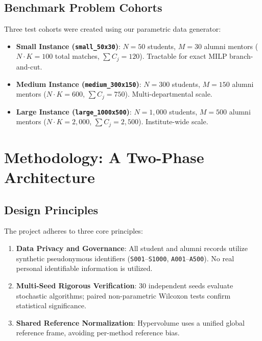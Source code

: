 \documentclass[11pt,a4paper,oneside]{report}
\begin{document}
\section{Benchmark Problem Cohorts}
Three test cohorts were created using our parametric data generator:
\begin{itemize}
    \item \textbf{Small Instance (\texttt{small\_50x30})}: $N = 50$ students, $M = 30$ alumni mentors ($N \cdot K = 100$ total matches, $\sum C_j = 120$). Tractable for exact MILP branch-and-cut.
    \item \textbf{Medium Instance (\texttt{medium\_300x150})}: $N = 300$ students, $M = 150$ alumni mentors ($N \cdot K = 600$, $\sum C_j = 750$). Multi-departmental scale.
    \item \textbf{Large Instance (\texttt{large\_1000x500})}: $N = 1,000$ students, $M = 500$ alumni mentors ($N \cdot K = 2,000$, $\sum C_j = 2,500$). Institute-wide scale.
\end{itemize}

\chapter{Methodology: A Two-Phase Architecture}

\section{Design Principles}
The project adheres to three core principles:
\begin{enumerate}
    \item \textbf{Data Privacy and Governance}: All student and alumni records utilize synthetic pseudonymous identifiers (\texttt{S001}--\texttt{S1000}, \texttt{A001}--\texttt{A500}). No real personal identifiable information is utilized.
    \item \textbf{Multi-Seed Rigorous Verification}: 30 independent seeds evaluate stochastic algorithms; paired non-parametric Wilcoxon tests confirm statistical significance.
    \item \textbf{Shared Reference Normalization}: Hypervolume uses a unified global reference frame, avoiding per-method reference bias.
\end{enumerate}
\end{document}
